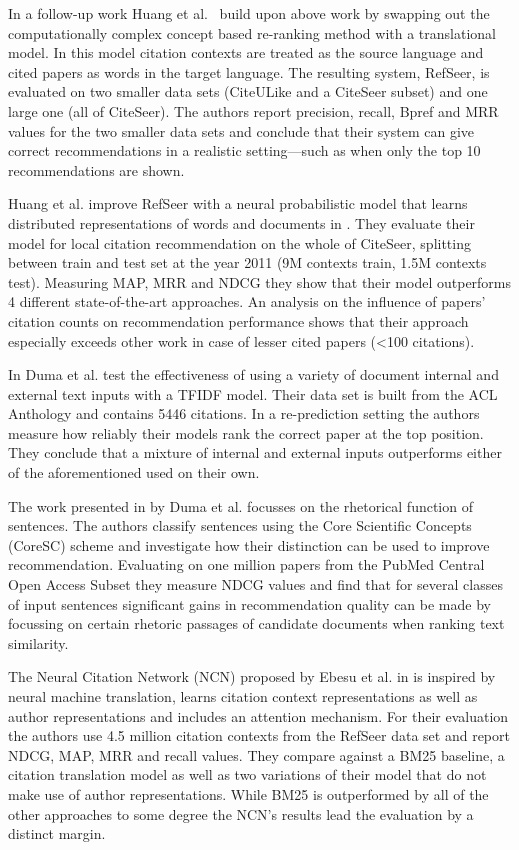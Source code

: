 In a follow-up work Huang et al.~\cite{Huang2014} build upon above work by swapping out the computationally complex concept based re-ranking method with a translational model. In this model citation contexts are treated as the source language and cited papers as words in the target language. The resulting system, RefSeer, is evaluated on two smaller data sets (CiteULike and a CiteSeer subset) and one large one (all of CiteSeer). The authors report precision, recall, Bpref and MRR values for the two smaller data sets and conclude that their system can give correct recommendations in a realistic setting---such as when only the top 10 recommendations are shown.

Huang et al. improve RefSeer with a neural probabilistic model that learns distributed representations of words and documents in \cite{Huang2015}. They evaluate their model for local citation recommendation on the whole of CiteSeer, splitting between train and test set at the year 2011 (9M contexts train, 1.5M contexts test). Measuring MAP, MRR and NDCG they show that their model outperforms 4 different state-of-the-art approaches. An analysis on the influence of papers' citation counts on recommendation performance shows that their approach especially exceeds other work in case of lesser cited papers (<100 citations).

In \cite{Duma2014} Duma et al. test the effectiveness of using a variety of document internal and external text inputs with a TFIDF model. Their data set is built from the ACL Anthology and contains 5446 citations. In a re-prediction setting the authors measure how reliably their models rank the correct paper at the top position. %
They conclude that a mixture of internal and external inputs outperforms either of the aforementioned used on their own.

The work presented in \cite{Duma2016} by Duma et al. focusses on the rhetorical function of sentences. The authors classify sentences using the Core Scientific Concepts (CoreSC) scheme and investigate how their distinction can be used to improve recommendation. Evaluating on one million papers from the PubMed Central Open Access Subset they measure NDCG values and find that for several classes of input sentences significant gains in recommendation quality can be made by focussing on certain rhetoric passages of candidate documents when ranking text similarity.

The Neural Citation Network (NCN) proposed by Ebesu et al. in \cite{Ebesu2017} is inspired by neural machine translation, learns citation context representations as well as author representations and includes an attention mechanism. For their evaluation the authors use 4.5 million citation contexts from the RefSeer data set and report NDCG, MAP, MRR and recall values. They compare against a BM25 baseline, a citation translation model as well as two variations of their model that do not make use of author representations. While BM25 is outperformed by all of the other approaches to some degree the NCN's results lead the evaluation by a distinct margin.

